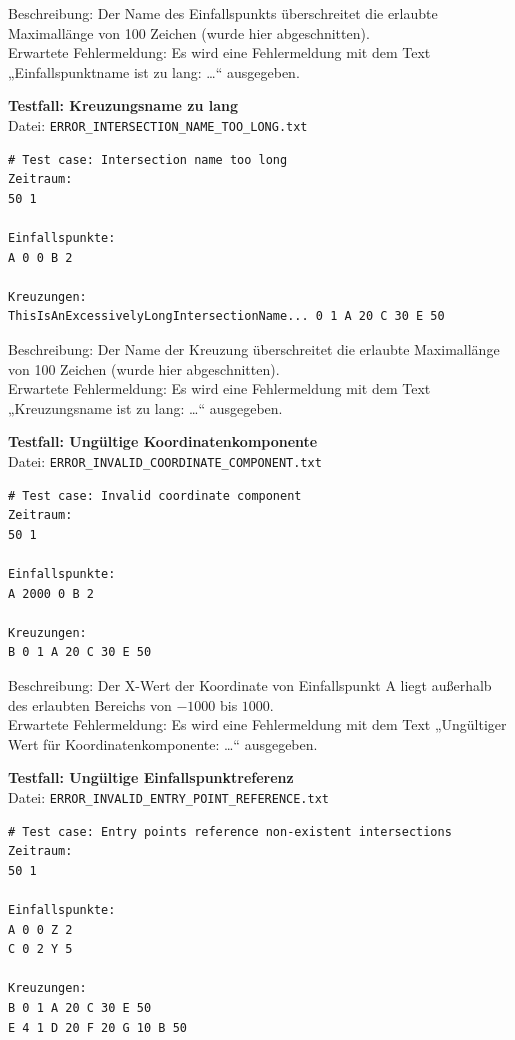 Beschreibung: Der Name des Einfallspunkts überschreitet die erlaubte Maximallänge von 100 Zeichen (wurde hier abgeschnitten). \\
Erwartete Fehlermeldung: Es wird eine Fehlermeldung mit dem Text „Einfallspunktname ist zu lang: …“ ausgegeben.

\clearpage

\textbf{Testfall: Kreuzungsname zu lang} \\
Datei: \texttt{ERROR\_INTERSECTION\_NAME\_TOO\_LONG.txt}

\begin{lstlisting}
# Test case: Intersection name too long
Zeitraum:
50 1

Einfallspunkte:
A 0 0 B 2

Kreuzungen:
ThisIsAnExcessivelyLongIntersectionName... 0 1 A 20 C 30 E 50
\end{lstlisting}

Beschreibung: Der Name der Kreuzung überschreitet die erlaubte Maximallänge von 100 Zeichen (wurde hier abgeschnitten). \\
Erwartete Fehlermeldung: Es wird eine Fehlermeldung mit dem Text „Kreuzungsname ist zu lang: …“ ausgegeben.

\textbf{Testfall: Ungültige Koordinatenkomponente} \\
Datei: \texttt{ERROR\_INVALID\_COORDINATE\_COMPONENT.txt}

\begin{lstlisting}
# Test case: Invalid coordinate component
Zeitraum:
50 1

Einfallspunkte:
A 2000 0 B 2

Kreuzungen:
B 0 1 A 20 C 30 E 50
\end{lstlisting}

Beschreibung: Der X-Wert der Koordinate von Einfallspunkt A liegt außerhalb des erlaubten Bereichs von \(-1000\) bis \(1000\). \\
Erwartete Fehlermeldung: Es wird eine Fehlermeldung mit dem Text „Ungültiger Wert für Koordinatenkomponente: …“ ausgegeben.

\clearpage

\textbf{Testfall: Ungültige Einfallspunktreferenz} \\
Datei: \texttt{ERROR\_INVALID\_ENTRY\_POINT\_REFERENCE.txt}

\begin{lstlisting}
# Test case: Entry points reference non-existent intersections
Zeitraum:
50 1

Einfallspunkte:
A 0 0 Z 2
C 0 2 Y 5

Kreuzungen:
B 0 1 A 20 C 30 E 50
E 4 1 D 20 F 20 G 10 B 50
\end{lstlisting}

